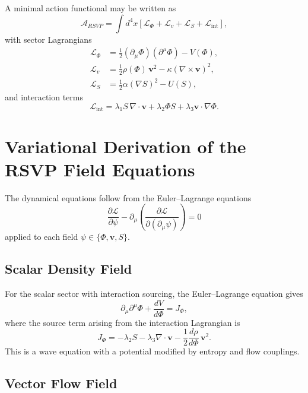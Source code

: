 \documentclass[12pt,a4paper]{article}
\theoremstyle{plain}
\theoremstyle{definition}
\theoremstyle{remark}
\begin{document}
A minimal action functional may be written as
\begin{equation}
\mathcal{A}_{RSVP} =
\int d^4x \left[
\mathcal{L}_\Phi + \mathcal{L}_v + \mathcal{L}_S + \mathcal{L}_{\text{int}}
\right],
\end{equation}
with sector Lagrangians
\begin{align}
\mathcal{L}_\Phi &=
\frac{1}{2}(\partial_\mu \Phi)(\partial^\mu \Phi) - V(\Phi), \\
\mathcal{L}_v &=
\frac{1}{2}\rho(\Phi)\,\mathbf{v}^2 - \kappa(\nabla \times \mathbf{v})^2, \\
\mathcal{L}_S &=
\frac{1}{2}\alpha(\nabla S)^2 - U(S),
\end{align}
and interaction terms
\begin{equation}
\mathcal{L}_{\text{int}} =
\lambda_1 S\,\nabla \cdot \mathbf{v}
+ \lambda_2 \Phi S
+ \lambda_3 \mathbf{v} \cdot \nabla \Phi.
\end{equation}

\section{Variational Derivation of the RSVP Field Equations}

The dynamical equations follow from the Euler--Lagrange equations
\begin{equation}
\frac{\partial \mathcal{L}}{\partial \psi}
- \partial_\mu
\left(\frac{\partial \mathcal{L}}{\partial(\partial_\mu \psi)}\right) = 0
\end{equation}
applied to each field $\psi \in \{\Phi, \mathbf{v}, S\}$.

\subsection{Scalar Density Field}

For the scalar sector with interaction sourcing, the Euler--Lagrange
equation gives
\begin{equation}
\partial_\mu \partial^\mu \Phi + \frac{dV}{d\Phi} = J_\Phi,
\end{equation}
where the source term arising from the interaction Lagrangian is
\begin{equation}
J_\Phi = -\lambda_2 S - \lambda_3 \nabla \cdot \mathbf{v}
- \frac{1}{2}\frac{d\rho}{d\Phi}\,\mathbf{v}^2.
\end{equation}
This is a wave equation with a potential modified by entropy and flow
couplings.

\subsection{Vector Flow Field}
\end{document}
